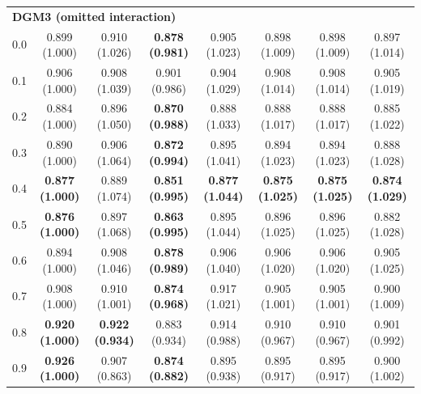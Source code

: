 \begin{table}[!h]
{\begin{tabular}[t]{|c|ccccccc|}
\hline
\multicolumn{8}{|l|}{\textbf{DGM3 (omitted interaction)}}\\
\hspace{1em}0.0 & 0.899 (1.000) & 0.910 (1.026) & \textbf{0.878 (0.981)} & 0.905 (1.023) & 0.898 (1.009) & 0.898 (1.009) & 0.897 (1.014)\\
\hspace{1em}0.1 & 0.906 (1.000) & 0.908 (1.039) & 0.901 (0.986) & 0.904 (1.029) & 0.908 (1.014) & 0.908 (1.014) & 0.905 (1.019)\\
\hspace{1em}0.2 & 0.884 (1.000) & 0.896 (1.050) & \textbf{0.870 (0.988)} & 0.888 (1.033) & 0.888 (1.017) & 0.888 (1.017) & 0.885 (1.022)\\
\hspace{1em}0.3 & 0.890 (1.000) & 0.906 (1.064) & \textbf{0.872 (0.994)} & 0.895 (1.041) & 0.894 (1.023) & 0.894 (1.023) & 0.888 (1.028)\\
\hspace{1em}0.4 & \textbf{0.877 (1.000)} & 0.889 (1.074) & \textbf{0.851 (0.995)} & \textbf{0.877 (1.044)} & \textbf{0.875 (1.025)} & \textbf{0.875 (1.025)} & \textbf{0.874 (1.029)}\\
\hspace{1em}0.5 & \textbf{0.876 (1.000)} & 0.897 (1.068) & \textbf{0.863 (0.995)} & 0.895 (1.044) & 0.896 (1.025) & 0.896 (1.025) & 0.882 (1.028)\\
\hspace{1em}0.6 & 0.894 (1.000) & 0.908 (1.046) & \textbf{0.878 (0.989)} & 0.906 (1.040) & 0.906 (1.020) & 0.906 (1.020) & 0.905 (1.025)\\
\hspace{1em}0.7 & 0.908 (1.000) & 0.910 (1.001) & \textbf{0.874 (0.968)} & 0.917 (1.021) & 0.905 (1.001) & 0.905 (1.001) & 0.900 (1.009)\\
\hspace{1em}0.8 & \textbf{0.920 (1.000)} & \textbf{0.922 (0.934)} & 0.883 (0.934) & 0.914 (0.988) & 0.910 (0.967) & 0.910 (0.967) & 0.901 (0.992)\\
\hspace{1em}0.9 & \textbf{0.926 (1.000)} & 0.907 (0.863) & \textbf{0.874 (0.882)} & 0.895 (0.938) & 0.895 (0.917) & 0.895 (0.917) & 0.900 (1.002)\\
\hline
\end{tabular}}
\end{table}
